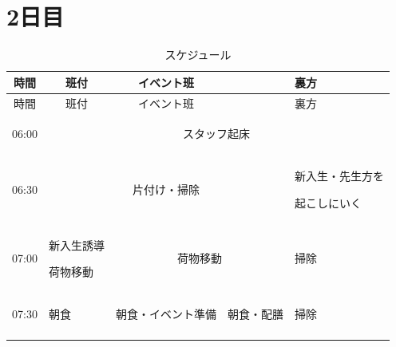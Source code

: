 \section{2日目}
\begin{longtable}[c]{|p{}|p{}|p{}|p{}|p{}|}
  \caption{スケジュール} \\
  \hline
  \multicolumn{1}{|c|}{時間} & \multicolumn{1}{c|}{班付} & \multicolumn{1}{c|}{イベント班} & \multicolumn{2}{c|}{裏方} \\
  \hline
  \endfirsthead
  
  \hline
  \multicolumn{1}{|c|}{時間} & \multicolumn{1}{c|}{班付} & \multicolumn{1}{c|}{イベント班} & \multicolumn{2}{c|}{裏方} \\
  \hline
  \endhead
  
  \hline
  \endfoot
  
  \hline
  \endlastfoot
  
  \begin{tpacol}
    06:00
  \end{tpacol}&
  \multicolumn{4}{c|}{スタッフ起床} \\
  \hdashline

  \begin{tpacol}
    06:30
  \end{tpacol}&
  \multicolumn{3}{c|}{片付け・掃除}&
  \begin{tpecol}
    新入生・先生方を \par
    起こしにいく
  \end{tpecol}\\
  \hdashline

  \begin{tpacol}
    07:00
  \end{tpacol}&
  \begin{tpbcol}
    新入生誘導 \par
    荷物移動
  \end{tpbcol}&
  \multicolumn{2}{c|}{荷物移動}&
  \begin{tpecol}
    掃除
  \end{tpecol}\\
  \hdashline

  \begin{tpacol}
    07:30
  \end{tpacol}&
  \begin{tpbcol}
    朝食
  \end{tpbcol}&
  \begin{tpccol}
    朝食・イベント準備
  \end{tpccol}&
  \begin{tpdcol}
    朝食・配膳
  \end{tpdcol}&
  \begin{tpecol}
    掃除
  \end{tpecol}\\
  \hdashline


\end{longtable}
